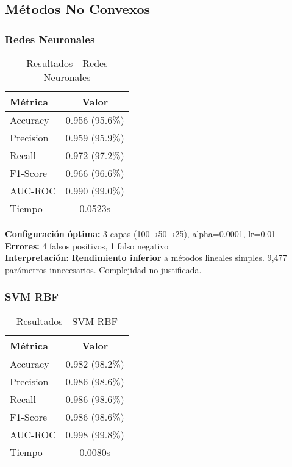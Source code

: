 \documentclass[12pt,a4paper]{article}
\begin{document}
\subsection{Métodos No Convexos}

\subsubsection{Redes Neuronales}

\begin{table}[H]
\centering
\caption{Resultados - Redes Neuronales}
\begin{tabular}{lc}
\toprule
\textbf{Métrica} & \textbf{Valor} \\
\midrule
Accuracy & 0.956 (95.6\%) \\
Precision & 0.959 (95.9\%) \\
Recall & 0.972 (97.2\%) \\
F1-Score & 0.966 (96.6\%) \\
AUC-ROC & 0.990 (99.0\%) \\
Tiempo & 0.0523s \\
\bottomrule
\end{tabular}
\end{table}

\textbf{Configuración óptima:} 3 capas (100→50→25), alpha=0.0001, lr=0.01\\
\textbf{Errores:} 4 falsos positivos, 1 falso negativo\\
\textbf{Interpretación:} \textbf{Rendimiento inferior} a métodos lineales simples. 9,477 parámetros innecesarios. Complejidad no justificada.

\subsubsection{SVM RBF}

\begin{table}[H]
\centering
\caption{Resultados - SVM RBF}
\begin{tabular}{lc}
\toprule
\textbf{Métrica} & \textbf{Valor} \\
\midrule
Accuracy & 0.982 (98.2\%) \\
Precision & 0.986 (98.6\%) \\
Recall & 0.986 (98.6\%) \\
F1-Score & 0.986 (98.6\%) \\
AUC-ROC & 0.998 (99.8\%) \\
Tiempo & 0.0080s \\
\bottomrule
\end{tabular}
\end{table}
\end{document}
